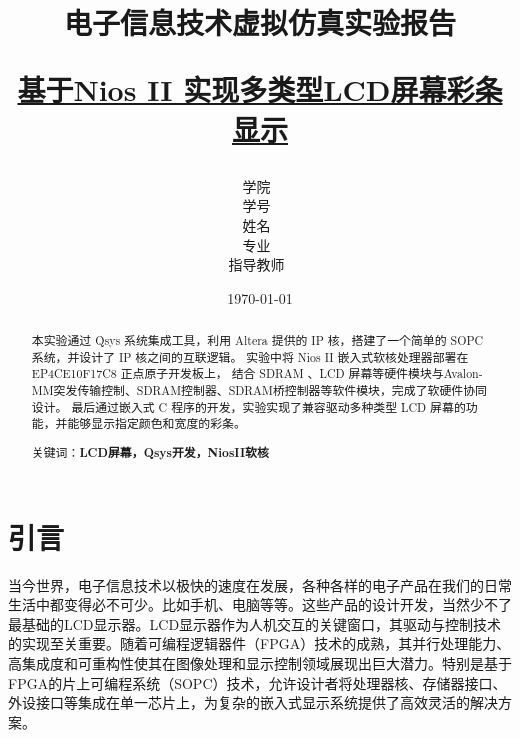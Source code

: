 \documentclass[12pt,hyperref,a4paper,UTF8]{ctexart}
\title{ 
        \vspace{1cm}
        \heiti \Huge \textbf{电子信息技术虚拟仿真实验报告} \par
        \vspace{1cm} 
        \heiti \Large {\underline{基于Nios II 实现多类型LCD屏幕彩条显示}   } 
        \vspace{1cm}
    
    }
\author{
        \vspace{0.5cm}
        \kaishu\Large 学院\ \dlmu[9cm]{卓越学院} \\ %
        \vspace{0.5cm}
        \kaishu\Large 学号\ \dlmu[9cm]{23040447} \\ %
        \vspace{0.5cm}
        \kaishu\Large 姓名\ \dlmu[9cm]{陈文轩} \qquad  \\ %
        \vspace{0.5cm}
        \kaishu\Large 专业\ \dlmu[9cm]{智能硬件与系统(电子信息工程)} \qquad \\ %
        \vspace{0.5cm}
        \kaishu\Large 指导教师\ \dlmu[9cm]{徐魁文、吴岩} \qquad \\ %
    }
\date{\today} %
\begin{document}
\cover
\thispagestyle{empty} %







\newpage
\setcounter{page}{1} %




\newpage
\begin{abstract}
本实验通过 Qsys 系统集成工具，利用 Altera 提供的 IP 核，搭建了一个简单的 SOPC 系统，并设计了 IP 核之间的互联逻辑。
实验中将 Nios II 嵌入式软核处理器部署在 EP4CE10F17C8 正点原子开发板上，
结合 SDRAM 、LCD 屏幕等硬件模块与Avalon-MM突发传输控制、SDRAM控制器、SDRAM桥控制器等软件模块，完成了软硬件协同设计。
最后通过嵌入式 C 程序的开发，实验实现了兼容驱动多种类型 LCD 屏幕的功能，并能够显示指定颜色和宽度的彩条。



关键词：\textbf{LCD屏幕，Qsys开发，NiosII软核}
\end{abstract}

\thispagestyle{empty} %
\newpage

\section{引言}

当今世界，电子信息技术以极快的速度在发展，各种各样的电子产品在我们的日常生活中都变得必不可少。比如手机、电脑等等。这些产品的设计开发，当然少不了最基础的LCD显示器。LCD显示器作为人机交互的关键窗口，其驱动与控制技术的实现至关重要。随着可编程逻辑器件（FPGA）技术的成熟，其并行处理能力、高集成度和可重构性使其在图像处理和显示控制领域展现出巨大潜力。特别是基于FPGA的片上可编程系统（SOPC）技术，允许设计者将处理器核、存储器接口、外设接口等集成在单一芯片上，为复杂的嵌入式显示系统提供了高效灵活的解决方案。
\end{document}
